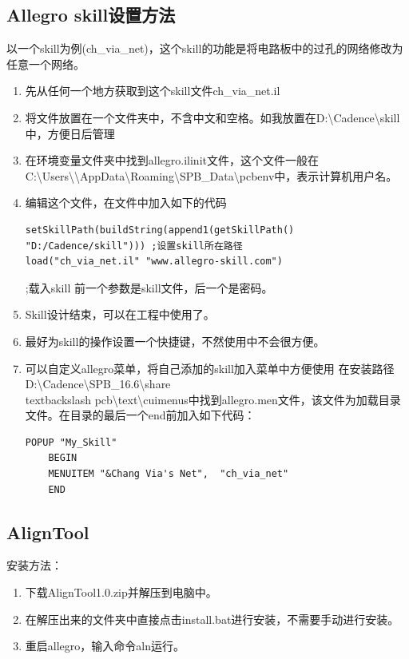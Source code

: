 \documentclass[color=green,mathpazo,titlestyle=hang,11pt]{elegantbook}
\begin{document}
	\subsection{Allegro skill设置方法}
	以一个skill为例(ch\_via\_net)，这个skill的功能是将电路板中的过孔的网络修改为任意一个网络。
		\begin{enumerate}
			\item 先从任何一个地方获取到这个skill文件ch\_via\_net.il
			\item 将文件放置在一个文件夹中，不含中文和空格。如我放置在D:\textbackslash Cadence\textbackslash{skill}中，方便日后管理
			\item 在环境变量文件夹中找到allegro.ilinit文件，这个文件一般在C:\textbackslash Users\textbackslash\*\textbackslash AppData\textbackslash Roaming\textbackslash SPB\_Data\textbackslash pcbenv中，\*表示计算机用户名。
			\item 编辑这个文件，在文件中加入如下的代码
			\begin{lstlisting}
setSkillPath(buildString(append1(getSkillPath() "D:/Cadence/skill"))) ;设置skill所在路径
load("ch_via_net.il" "www.allegro-skill.com")
			\end{lstlisting};载入skill 前一个参数是skill文件，后一个是密码。
			\item Skill设计结束，可以在工程中使用了。
			\item 最好为skill的操作设置一个快捷键，不然使用中不会很方便。
			\item 可以自定义allegro菜单，将自己添加的skill加入菜单中方便使用
  				在安装路径D:\textbackslash Cadence\textbackslash SPB\_16.6\textbackslash share\\textbackslash pcb\textbackslash text\textbackslash cuimenus中找到allegro.men文件，该文件为加载目录文件。在目录的最后一个end前加入如下代码：
  		\begin{lstlisting}
POPUP "My_Skill"
	BEGIN
	MENUITEM "&Chang Via's Net",  "ch_via_net"
	END
		\end{lstlisting}
		\end{enumerate}



	\subsection{AlignTool}
	安装方法：
	\begin{enumerate}
		\item 下载AlignTool1.0.zip并解压到电脑中。
		\item 在解压出来的文件夹中直接点击install.bat进行安装，不需要手动进行安装。
		\item 重启allegro，输入命令aln运行。 
	\end{enumerate}
\end{document}

